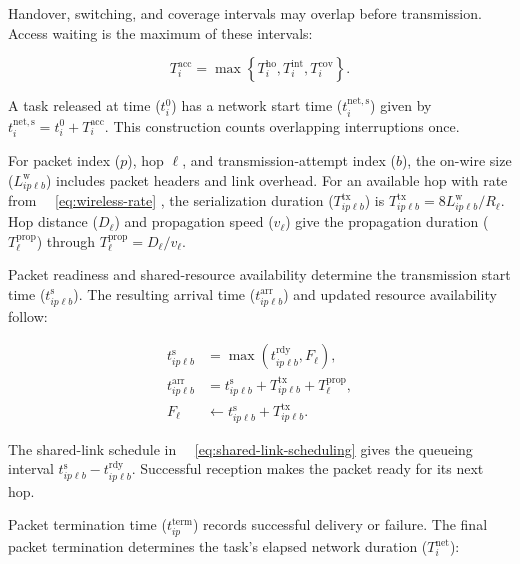 \documentclass[journal]{IEEEtran}
\providecommand*{\algorithmautorefname}{Algorithm}
\providecommand*{\figureautorefname}{Figure}
\providecommand*{\subfigureautorefname}{Figure}
\providecommand*{\Autoref}[1]{%
  \begingroup
  \def\sectionautorefname{Section}%
  \def\subsectionautorefname{Subsection}%
  \def\subsubsectionautorefname{Subsubsection}%
  \def\algorithmautorefname{Algorithm}%
  \def\figureautorefname{Figure}%
  \def\subfigureautorefname{Figure}%
 ~\autoref{#1}%
  \endgroup
}
\newcommand{\Autoref}[1]{Eq.~\Autoref{#1}}
\begin{document}
Handover, switching, and coverage intervals may overlap before transmission. Access waiting is the maximum of these intervals:

\begin{equation}
\label{eq:access-waiting}
T_i^{\mathrm{acc}}
=
\max\left\{
T_i^{\mathrm{ho}},
T_i^{\mathrm{int}},
T_i^{\mathrm{cov}}
\right\}.
\end{equation}

A task released at time (\(t_i^0\)) has a network start time (\(t_i^{\mathrm{net,s}}\)) given by \(t_i^{\mathrm{net,s}}=t_i^0+T_i^{\mathrm{acc}}\). This construction counts overlapping interruptions once.

For packet index (\(p\)), hop \(\ell\), and transmission-attempt index (\(b\)), the on-wire size (\(L_{ip\ell b}^{\mathrm w}\)) includes packet headers and link overhead. For an available hop with rate from~\Autoref{eq:wireless-rate}, the serialization duration (\(T_{ip\ell b}^{\mathrm{tx}}\)) is \(T_{ip\ell b}^{\mathrm{tx}}=8L_{ip\ell b}^{\mathrm w}/R_\ell\). Hop distance (\(D_\ell\)) and propagation speed (\(v_\ell\)) give the propagation duration (\(T_\ell^{\mathrm{prop}}\)) through \(T_\ell^{\mathrm{prop}}=D_\ell/v_\ell\).

Packet readiness and shared-resource availability determine the transmission start time (\(t_{ip\ell b}^{\mathrm s}\)). The resulting arrival time (\(t_{ip\ell b}^{\mathrm{arr}}\)) and updated resource availability follow:

\begin{equation}
\label{eq:shared-link-scheduling}
\begin{aligned}
t_{ip\ell b}^{\mathrm s}
&=\max(t_{ip\ell b}^{\mathrm{rdy}},F_\ell),\\
t_{ip\ell b}^{\mathrm{arr}}
&=t_{ip\ell b}^{\mathrm s}
+T_{ip\ell b}^{\mathrm{tx}}
+T_\ell^{\mathrm{prop}},\\
F_\ell
&\leftarrow
t_{ip\ell b}^{\mathrm s}+T_{ip\ell b}^{\mathrm{tx}}.
\end{aligned}
\end{equation}

The shared-link schedule in~\Autoref{eq:shared-link-scheduling} gives the queueing interval \(t_{ip\ell b}^{\mathrm s}-t_{ip\ell b}^{\mathrm{rdy}}\). Successful reception makes the packet ready for its next hop. 

Packet termination time (\(t_{ip}^{\mathrm{term}}\)) records successful delivery or failure. The final packet termination determines the task’s elapsed network duration (\(T_i^{\mathrm{net}}\)):
\end{document}
